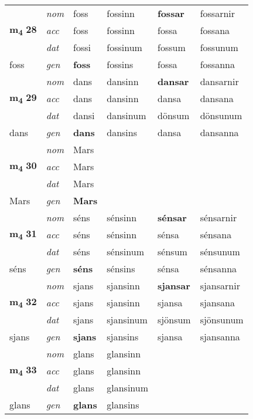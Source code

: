 \begin{longtable}[l]{X>{\footnotesize\itshape}XXXXX}
\multirow{3}{*}{{{\textbf{m{\textsubscript{4}}} \Large{\textbf{28}}}}} & nom & foss & fossinn & \textbf{fossar} & fossarnir \\*
 & acc & foss & fossinn & fossa & fossana \\*
 & dat & fossi & fossinum & fossum & fossunum \\*
 {\footnotesize{foss}} & gen & \textbf{foss} & fossins & fossa & fossanna \\
\midrule

\multirow{3}{*}{{{\textbf{m{\textsubscript{4}}} \Large{\textbf{29}}}}} & nom & dans & dansinn & \textbf{dansar} & dansarnir \\*
 & acc & dans & dansinn & dansa & dansana \\*
 & dat & dansi & dansinum & dönsum & dönsunum \\*
 {\footnotesize{dans}} & gen & \textbf{dans} & dansins & dansa & dansanna \\
\midrule

\multirow{3}{*}{{{\textbf{m{\textsubscript{4}}} \Large{\textbf{30}}}}} & nom & Mars &  & \textbf{} &  \\*
 & acc & Mars &  &  &  \\*
 & dat & Mars &  &  &  \\*
 {\footnotesize{Mars}} & gen & \textbf{Mars} &  &  &  \\
\midrule

\multirow{3}{*}{{{\textbf{m{\textsubscript{4}}} \Large{\textbf{31}}}}} & nom & séns & sénsinn & \textbf{sénsar} & sénsarnir \\*
 & acc & séns & sénsinn & sénsa & sénsana \\*
 & dat & séns & sénsinum & sénsum & sénsunum \\*
 {\footnotesize{séns}} & gen & \textbf{séns} & sénsins & sénsa & sénsanna \\
\midrule

\multirow{3}{*}{{{\textbf{m{\textsubscript{4}}} \Large{\textbf{32}}}}} & nom & sjans & sjansinn & \textbf{sjansar} & sjansarnir \\*
 & acc & sjans & sjansinn & sjansa & sjansana \\*
 & dat & sjans & sjansinum & sjönsum & sjönsunum \\*
 {\footnotesize{sjans}} & gen & \textbf{sjans} & sjansins & sjansa & sjansanna \\
\midrule

\multirow{3}{*}{{{\textbf{m{\textsubscript{4}}} \Large{\textbf{33}}}}} & nom & glans & glansinn & \textbf{} &  \\*
 & acc & glans & glansinn &  &  \\*
 & dat & glans & glansinum &  &  \\*
 {\footnotesize{glans}} & gen & \textbf{glans} & glansins &  &  \\
\midrule


\end{longtable}
